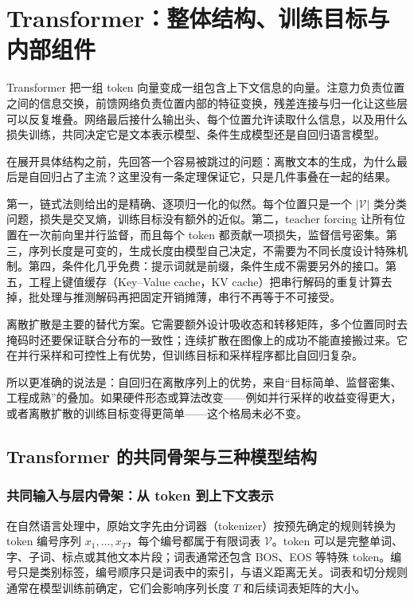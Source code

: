 \chapter{Transformer：整体结构、训练目标与内部组件}
\label{chap:transformer}

\begin{keybox}
Transformer 把一组 token 向量变成一组包含上下文信息的向量。注意力负责位置之间的信息交换，前馈网络负责位置内部的特征变换，残差连接与归一化让这些层可以反复堆叠。网络最后接什么输出头、每个位置允许读取什么信息，以及用什么损失训练，共同决定它是文本表示模型、条件生成模型还是自回归语言模型。
\end{keybox}

在展开具体结构之前，先回答一个容易被跳过的问题：离散文本的生成，为什么最后是自回归占了主流？这里没有一条定理保证它，只是几件事叠在一起的结果。

第一，链式法则给出的是精确、逐项归一化的似然。每个位置只是一个 \(|\mathcal V|\) 类分类问题，损失是交叉熵，训练目标没有额外的近似。第二，teacher forcing 让所有位置在一次前向里并行监督，而且每个 token 都贡献一项损失，监督信号密集。第三，序列长度是可变的，生成长度由模型自己决定，不需要为不同长度设计特殊机制。第四，条件化几乎免费：提示词就是前缀，条件生成不需要另外的接口。第五，工程上键值缓存（Key--Value cache，KV cache）把串行解码的重复计算去掉，批处理与推测解码再把固定开销摊薄，串行不再等于不可接受。

离散扩散是主要的替代方案。它需要额外设计吸收态和转移矩阵，多个位置同时去掩码时还要保证联合分布的一致性；连续扩散在图像上的成功不能直接搬过来。它在并行采样和可控性上有优势，但训练目标和采样程序都比自回归复杂。

所以更准确的说法是：自回归在离散序列上的优势，来自“目标简单、监督密集、工程成熟”的叠加。如果硬件形态或算法改变——例如并行采样的收益变得更大，或者离散扩散的训练目标变得更简单——这个格局未必不变。

\section{Transformer 的共同骨架与三种模型结构}

\subsection{共同输入与层内骨架：从 token 到上下文表示}

在自然语言处理中，原始文字先由分词器（tokenizer）按预先确定的规则转换为 token 编号序列 \(x_1,\ldots,x_T\)，每个编号都属于有限词表 \(\mathcal V\)。token 可以是完整单词、字、子词、标点或其他文本片段；词表通常还包含 BOS、EOS 等特殊 token。编号只是类别标签，编号顺序只是词表中的索引，与语义距离无关。词表和切分规则通常在模型训练前确定，它们会影响序列长度 \(T\) 和后续词表矩阵的大小。

